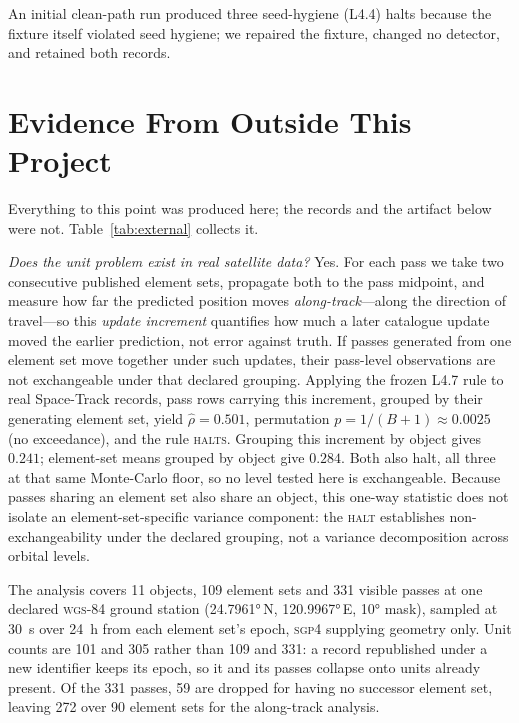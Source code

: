 \documentclass[conference]{IEEEtran}
\newcommand{\rulename}[1]{\textsf{#1}}
\newcommand{\artv}[2]{#2}
\begin{document}


An initial clean-path run produced three seed-hygiene (\rulename{L4.4}) halts because the fixture
itself violated seed hygiene; we repaired the fixture, changed no detector, and retained both records.



\section{Evidence From Outside This Project}
\label{sec:external}

Everything to this point was produced here; the records and the artifact below were not. Table~\ref{tab:external} collects it.

\emph{Does the unit problem exist in real satellite data?} Yes. For each pass we take two
consecutive published element sets, propagate both to the pass midpoint, and measure how far the
predicted position moves \emph{along-track}---along the direction of travel---so this \emph{update
increment} quantifies how much a later catalogue update moved the earlier prediction, not error
against truth. If passes generated from one
element set move together under such updates, their pass-level observations are not exchangeable
under that declared grouping. Applying the frozen
\rulename{L4.7} rule to real Space-Track records, pass rows carrying this increment,
grouped by their generating element set, yield $\hat{\rho}=\artv{at_icc_d1}{0.501}$, permutation
$p=1/(B+1)\approx\artv{at_p}{0.0025}$ (no exceedance), and the rule
\textsc{halts}. Grouping this increment by object gives $\artv{at_icc_d2}{0.241}$; element-set means grouped by
object give $\artv{at_icc_d3}{0.284}$. Both also halt, all three at that same Monte-Carlo
floor, so no level tested here is exchangeable. Because passes sharing an element set also share
an object, this one-way statistic does not isolate an element-set-specific variance component:
the \textsc{halt} establishes non-exchangeability under the declared grouping, not a variance
decomposition across orbital levels.

The analysis covers \artv{real_objects}{\num{11}} objects, \artv{real_elsets}{\num{109}} element
sets and \artv{real_passes}{\num{331}} visible passes at one declared \textsc{wgs}-84 ground station
(\ang{\artv{st_lat}{24.7961}}\,N, \ang{\artv{st_lon}{120.9967}}\,E, \ang{\artv{st_mask}{10}} mask),
sampled at \qty{\artv{st_dt}{30}}{\second} over \qty{\artv{st_horizon}{24}}{\hour} from each element
set's epoch, \textsc{sgp4} supplying geometry only. Unit
counts are \artv{real_units_a}{\num{101}} and \artv{real_units_b}{\num{305}} rather than
\artv{real_elsets}{\num{109}} and \artv{real_passes}{\num{331}}: a record republished under a new
identifier keeps its epoch, so it and its passes collapse onto units already present. Of the \artv{real_passes}{\num{331}} passes,
\artv{at_dropped}{\num{59}} are dropped for having no successor element set, leaving
\artv{at_passes}{\num{272}} over \artv{at_elsets}{\num{90}} element sets for the along-track
analysis.
\end{document}

